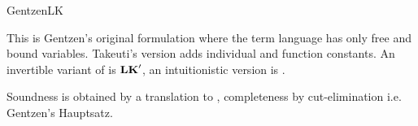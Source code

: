 \begin{entry}{GentzenLK}
 \begin{history}
This is Gentzen's original formulation\cite{lk:Gentzen1935} where the term language has only free and bound variables. Takeuti's version\cite{lk:Takeuti1975} adds individual and function constants. An invertible variant of \LK is $\mathbf{LK}'$, an intuitionistic version is \LJ{}. 
\end{history}

\begin{technicalities}
Soundness is obtained by a translation to \ND{}, completeness by cut-elimination i.e. Gentzen's Hauptsatz\cite{lk:Gentzen1935}.
\end{technicalities}

\end{entry}
\let\LKAX\undefined
\let\LKUI\undefined
\let\LKBI\undefined
\let\LKLL\undefined
\let\LKRL\undefined
\let\LKRLN\undefined

\let\SALLL  \undefined
\let\SALLR  \undefined
\let\SEXL   \undefined
\let\SEXR   \undefined
\let\SANDL  \undefined
\let\SANDR  \undefined
\let\SORL   \undefined
\let\SORR   \undefined
\let\SIMPL  \undefined
\let\SIMPR  \undefined
\let\SNEGL  \undefined
\let\SNEGR  \undefined
\let\SWEAKL \undefined
\let\SWEAKR \undefined
\let\SCONTRL\undefined
\let\SCONTRR\undefined
\let\SEXCHL \undefined
\let\SEXCHR \undefined
\let\SCUT   \undefined
\let\SDEF   \undefined

\let\ALLL  \undefined
\let\ALLR  \undefined
\let\EXL   \undefined
\let\EXR   \undefined
\let\ANDL  \undefined
\let\ANDR  \undefined
\let\ORL   \undefined
\let\ORR   \undefined
\let\IMPL  \undefined
\let\IMPR  \undefined
\let\NEGL  \undefined
\let\NEGR  \undefined
\let\WEAKL \undefined
\let\WEAKR \undefined
\let\CONTRL\undefined
\let\CONTRR\undefined
\let\EXCHL \undefined
\let\EXCHR \undefined
\let\CUT   \undefined
\let\DEF   \undefined
